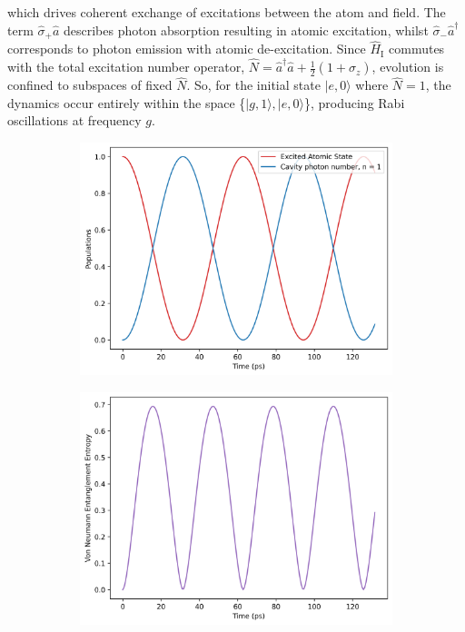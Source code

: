 \documentclass[11pt]{article}
\begin{document}
which drives coherent exchange of excitations between the atom and field. The term $\hat{\sigma}_{+}\hat{a}$ describes photon absorption resulting in atomic excitation, whilst $\hat{\sigma}_{-}\hat{a}^\dagger$ corresponds to photon emission with atomic de-excitation. Since $\hat{H}_{\scriptscriptstyle\text{I}}$ commutes with the total excitation number operator, $\hat{N} = \hat{a}^\dagger \hat{a} + \frac{1}{2}(1 + \hat{\sigma}_z)$, evolution is confined to subspaces of fixed $\hat{N}$. So, for the initial state $|e,0\rangle$ where $\hat{N} = 1$, the dynamics occur entirely within the space \{$|g,1\rangle,|e,0\rangle$\}, producing Rabi oscillations at frequency $g$.
\begin{figure}[H]
    \centering
    \begin{subfigure}{0.45\textwidth}
        \centering
        \includegraphics[width=\linewidth]{Research Project/Code/results/JCM/CQS_expt.png}
        \caption{}
        \label{fig:JCM_cqs_xpt_e0}
    \end{subfigure}
    \begin{subfigure}{0.45\textwidth}
        \centering
        \includegraphics[width=\linewidth]{Research Project/Code/results/JCM/CQS_vne.png}
        \caption{}
        \label{fig:JCM_cqs_vne_e0}
    \end{subfigure}
    

\end{figure}
\end{document}
